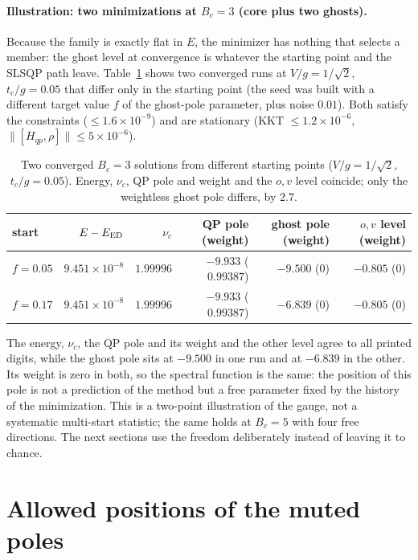 \documentclass[11pt]{article}
\begin{document}
\paragraph{Illustration: two minimizations at $B_c=3$ (core plus two ghosts).} Because the family is exactly flat in $E$, the minimizer has nothing that selects a member: the ghost level at convergence is whatever the starting point and the SLSQP path leave. Table~\ref{tab:twostarts} shows two converged runs at $V/g=1/\sqrt2$, $t_c/g=0.05$ that differ only in the starting point (the seed was built with a different target value $f$ of the ghost-pole parameter, plus noise $0.01$). Both satisfy the constraints ($\le1.6\times10^{-9}$) and are stationary (KKT $\le1.2\times10^{-6}$, $\|[H_{qp},\rho]\|\le5\times10^{-6}$).
\begin{table}[h]
\centering\small
\begin{tabular}{l r r r r r}
\toprule
start & $E-E_{\rm ED}$ & $\nu_c$ & QP pole (weight) & ghost pole (weight) & $o,v$ level (weight)\\
\midrule
$f=0.05$ & $9.451\times10^{-8}$ & $1.99996$ & $-9.933$ ($0.99387$) & $\mathbf{-9.500}$ ($0$) & $-0.805$ ($0$)\\
$f=0.17$ & $9.451\times10^{-8}$ & $1.99996$ & $-9.933$ ($0.99387$) & $\mathbf{-6.839}$ ($0$) & $-0.805$ ($0$)\\
\bottomrule
\end{tabular}
\caption{Two converged $B_c=3$ solutions from different starting points ($V/g=1/\sqrt2$, $t_c/g=0.05$). Energy, $\nu_c$, QP pole and weight and the $o,v$ level coincide; only the weightless ghost pole differs, by $2.7$.}
\label{tab:twostarts}
\end{table}
The energy, $\nu_c$, the QP pole and its weight and the other level agree to all printed digits, while the ghost pole sits at $-9.500$ in one run and at $-6.839$ in the other. Its weight is zero in both, so the spectral function is the same: the position of this pole is not a prediction of the method but a free parameter fixed by the history of the minimization. This is a two-point illustration of the gauge, not a systematic multi-start statistic; the same holds at $B_c=5$ with four free directions. The next sections use the freedom deliberately instead of leaving it to chance.

\section{Allowed positions of the muted poles}
\label{sec:intervals}
\end{document}
